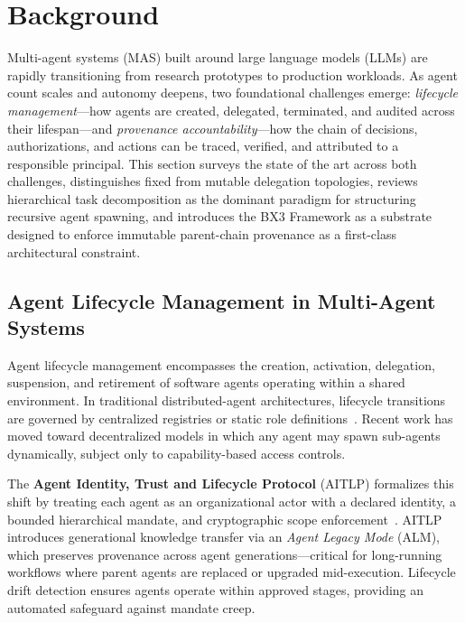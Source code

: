 
\section{Background}
\label{sec:background}

Multi-agent systems (MAS) built around large language models (LLMs) are rapidly transitioning from research prototypes to production workloads. As agent count scales and autonomy deepens, two foundational challenges emerge: \emph{lifecycle management}---how agents are created, delegated, terminated, and audited across their lifespan---and \emph{provenance accountability}---how the chain of decisions, authorizations, and actions can be traced, verified, and attributed to a responsible principal. This section surveys the state of the art across both challenges, distinguishes fixed from mutable delegation topologies, reviews hierarchical task decomposition as the dominant paradigm for structuring recursive agent spawning, and introduces the BX3 Framework as a substrate designed to enforce immutable parent-chain provenance as a first-class architectural constraint.

\subsection{Agent Lifecycle Management in Multi-Agent Systems}
\label{sec:lifecycle}

Agent lifecycle management encompasses the creation, activation, delegation, suspension, and retirement of software agents operating within a shared environment. In traditional distributed-agent architectures, lifecycle transitions are governed by centralized registries or static role definitions~\cite{wooldridge1999agents}. Recent work has moved toward decentralized models in which any agent may spawn sub-agents dynamically, subject only to capability-based access controls.

The \textbf{Agent Identity, Trust and Lifecycle Protocol} (AITLP) formalizes this shift by treating each agent as an organizational actor with a declared identity, a bounded hierarchical mandate, and cryptographic scope enforcement~\cite{draft-larsson-aitlp}. AITLP introduces generational knowledge transfer via an \emph{Agent Legacy Mode} (ALM), which preserves provenance across agent generations---critical for long-running workflows where parent agents are replaced or upgraded mid-execution. Lifecycle drift detection ensures agents operate within approved stages, providing an automated safeguard against mandate creep.

